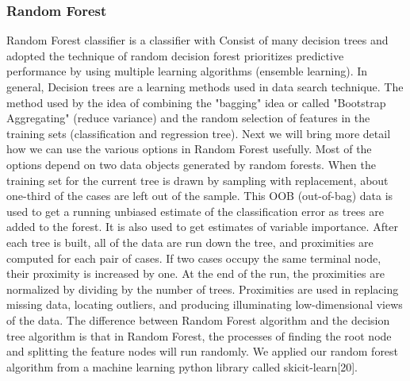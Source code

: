 \documentclass[10pt,twocolumn]{article}
\begin{document}
\subsubsection{Random Forest}
Random Forest classifier is a classifier with Consist of many decision trees and adopted the technique of random decision forest prioritizes predictive performance by using multiple learning algorithms (ensemble learning). In general, Decision trees are a learning methods used in data search technique. The method used by the idea of combining the "bagging" idea or called "Bootstrap Aggregating" (reduce variance) and the random selection of features in the training sets (classification and regression tree). 
Next we will bring more detail how we can use the various options in Random Forest usefully. Most of the options depend on two data objects generated by random forests. When the training set for the current tree is drawn by sampling with replacement, about one-third of the cases are left out of the sample. This OOB (out-of-bag) data is used to get a running unbiased estimate of the classification error as trees are added to the forest. It is also used to get estimates of variable importance. After each tree is built, all of the data are run down the tree, and proximities are computed for each pair of cases. If two cases occupy the same terminal node, their proximity is increased by one. At the end of the run, the proximities are normalized by dividing by the number of trees. Proximities are used in replacing missing data, locating outliers, and producing illuminating low-dimensional views of the data. 
The difference between Random Forest algorithm and the decision tree algorithm is that in Random Forest, the processes of finding the root node and splitting the feature nodes will run randomly. We applied our random forest algorithm from a machine learning python library called skicit-learn[20].
\end{document}

